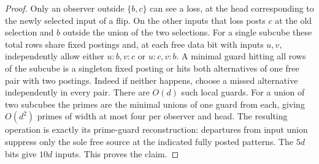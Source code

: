 \begin{proof}
Only an observer outside $\{b,c\}$ can see a loss, at the head
corresponding to the newly selected input of a flip. On the other
inputs that loss posts $c$ at the old selection and $b$ outside the
union of the two selections. For a single subcube these total
rows share fixed postings and, at each free data bit with inputs
$u,v$, independently allow either $u:b,v:c$ or $u:c,v:b$.
A minimal guard hitting all rows of the subcube is a singleton
fixed posting or hits both alternatives of one free pair with two
postings. Indeed if neither happens, choose a missed alternative
independently in every pair. There are $O(d)$ such local guards.
For a union of two subcubes the primes are the minimal unions of
one guard from each, giving $O(d^2)$ primes of width at most four
per observer and head. The resulting operation is exactly its
prime-guard reconstruction: departures from input union suppress
only the sole free source at the indicated fully posted patterns.
The $5d$ bits give $10d$ inputs. This proves the claim.
\end{proof}

